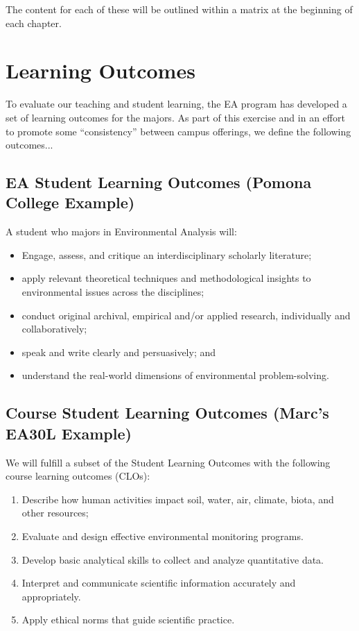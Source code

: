 \documentclass{tufte-book}\usepackage[]{graphicx}\usepackage[]{xcolor}
\begin{document}
The content for each of these will be outlined within a matrix at the beginning of each chapter.


\section{Learning Outcomes}

To evaluate our teaching and student learning, the EA program has developed a set of learning outcomes for the majors. As part of this exercise and in an effort to promote some ``consistency'' between campus offerings, we define the following outcomes...

\subsection{EA Student Learning Outcomes (Pomona College Example)}

A student who majors in Environmental Analysis will:

\begin{itemize}
	\item Engage, assess, and critique an interdisciplinary scholarly literature;
	\item apply relevant theoretical techniques and methodological insights to environmental issues across the disciplines;
	\item conduct original archival, empirical and/or applied research, individually and collaboratively;
	\item speak and write clearly and persuasively; and
	\item understand the real-world dimensions of environmental problem-solving.
\end{itemize}

\subsection{Course Student Learning Outcomes (Marc's EA30L Example)}

We will fulfill a subset of the Student Learning Outcomes with the following course learning outcomes (CLOs):
\begin{enumerate}
	\item Describe how human activities impact soil, water, air, climate, biota, and other resources;
	\item Evaluate and design effective environmental monitoring programs.
	\item Develop basic analytical skills to collect and analyze quantitative data.
	\item Interpret and communicate scientific information accurately and appropriately.
	\item Apply ethical norms that guide scientific practice.
\end{enumerate}
\end{document}
